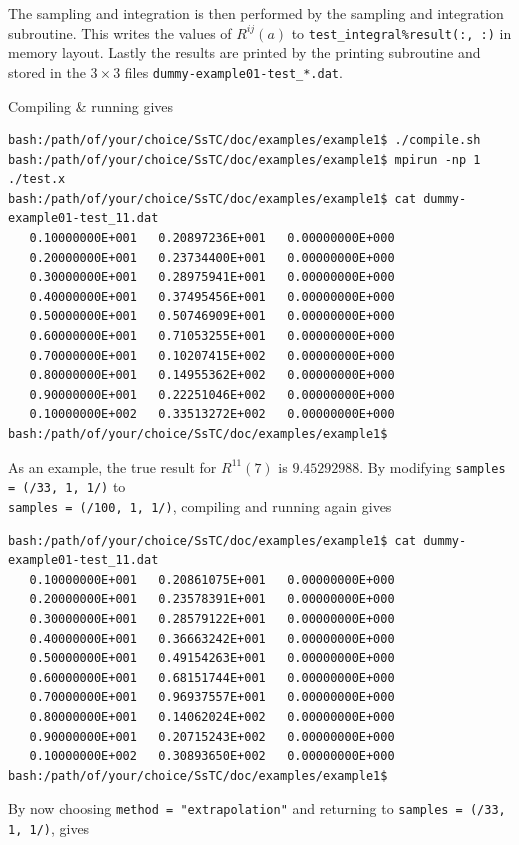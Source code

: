 \documentclass[10pt,a4paper]{article}
\begin{document}
The sampling and integration is then performed by the sampling and integration subroutine. This writes the values of $R^{ij}(a)$ to \verb|test_integral%result(:, :)| in memory layout. Lastly the results are printed by the printing subroutine and stored in the $3\times 3$ files \verb|dummy-example01-test_*.dat|.

Compiling \& running gives
\begin{codebox}{}
\begin{verbatim}
bash:/path/of/your/choice/SsTC/doc/examples/example1$ ./compile.sh
bash:/path/of/your/choice/SsTC/doc/examples/example1$ mpirun -np 1 ./test.x
bash:/path/of/your/choice/SsTC/doc/examples/example1$ cat dummy-example01-test_11.dat
   0.10000000E+001   0.20897236E+001   0.00000000E+000
   0.20000000E+001   0.23734400E+001   0.00000000E+000
   0.30000000E+001   0.28975941E+001   0.00000000E+000
   0.40000000E+001   0.37495456E+001   0.00000000E+000
   0.50000000E+001   0.50746909E+001   0.00000000E+000
   0.60000000E+001   0.71053255E+001   0.00000000E+000
   0.70000000E+001   0.10207415E+002   0.00000000E+000
   0.80000000E+001   0.14955362E+002   0.00000000E+000
   0.90000000E+001   0.22251046E+002   0.00000000E+000
   0.10000000E+002   0.33513272E+002   0.00000000E+000
bash:/path/of/your/choice/SsTC/doc/examples/example1$
\end{verbatim}
\end{codebox}
As an example, the true result for $R^{11}(7) $ is $9.45292988$. By modifying \verb|samples = (/33, 1, 1/)| to \\ \verb|samples = (/100, 1, 1/)|, compiling and running again gives
\begin{codebox}{}
\begin{verbatim}
bash:/path/of/your/choice/SsTC/doc/examples/example1$ cat dummy-example01-test_11.dat
   0.10000000E+001   0.20861075E+001   0.00000000E+000
   0.20000000E+001   0.23578391E+001   0.00000000E+000
   0.30000000E+001   0.28579122E+001   0.00000000E+000
   0.40000000E+001   0.36663242E+001   0.00000000E+000
   0.50000000E+001   0.49154263E+001   0.00000000E+000
   0.60000000E+001   0.68151744E+001   0.00000000E+000
   0.70000000E+001   0.96937557E+001   0.00000000E+000
   0.80000000E+001   0.14062024E+002   0.00000000E+000
   0.90000000E+001   0.20715243E+002   0.00000000E+000
   0.10000000E+002   0.30893650E+002   0.00000000E+000
bash:/path/of/your/choice/SsTC/doc/examples/example1$
\end{verbatim}
\end{codebox}
By now choosing \verb|method = "extrapolation"| and returning to \verb|samples = (/33, 1, 1/)|, gives
\end{document}
